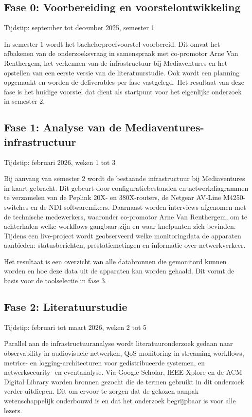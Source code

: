 \subsection{Fase 0: Voorbereiding en voorstelontwikkeling}

Tijdstip: september tot december 2025, semester 1

In semester 1 wordt het bachelorproefvoorstel voorbereid. Dit omvat het afbakenen van de onderzoeksvraag in samenspraak met co-promotor Arne Van Renthergem, het verkennen van de infrastructuur bij Mediaventures en het opstellen van een eerste versie van de literatuurstudie. Ook wordt een planning opgemaakt en worden de deliverables per fase vastgelegd. Het resultaat van deze fase is het huidige voorstel dat dient als startpunt voor het eigenlijke onderzoek in semester 2.

\subsection{Fase 1: Analyse van de Mediaventures-infrastructuur}

Tijdstip: februari 2026, weken 1 tot 3

Bij aanvang van semester 2 wordt de bestaande infrastructuur bij Mediaventures in kaart gebracht. Dit gebeurt door configuratiebestanden en netwerkdiagrammen te verzamelen van de Peplink 20X- en 380X-routers, de Netgear AV-Line M4250-switches en de NDI-softwaremixers. Daarnaast worden interviews afgenomen met de technische medewerkers, waaronder co-promotor Arne Van Renthergem, om te achterhalen welke workflows gangbaar zijn en waar knelpunten zich bevinden. Tijdens een live-project wordt geobserveerd welke monitoringdata de apparaten aanbieden: statusberichten, prestatiemetingen en informatie over netwerkverkeer.

Het resultaat is een overzicht van alle databronnen die gemonitord kunnen worden en hoe deze data uit de apparaten kan worden gehaald. Dit vormt de basis voor de toolselectie in fase 3.

\subsection{Fase 2: Literatuurstudie}

Tijdstip: februari tot maart 2026, weken 2 tot 5

Parallel aan de infrastructuuranalyse wordt literatuuronderzoek gedaan naar observability in audiovisuele netwerken, QoS-monitoring in streaming workflows, metrics- en logging-architecturen voor gedistribueerde systemen, en netwerksecurity- en eventanalyse. Via Google Scholar, IEEE Xplore en de ACM Digital Library worden bronnen gezocht die de termen gebruikt in dit onderzoek verder uitdiepen. Dit om ervoor te zorgen dat de gekozen aanpak wetenschappelijk onderbouwd is en dat het onderzoek begrijpbaar is voor alle lezers.

